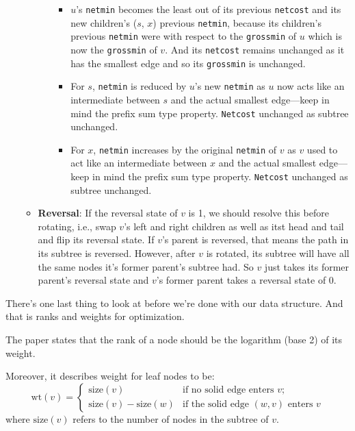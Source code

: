 \documentclass[a4paper, 11pt]{article}
\begin{document}
\begin{enumerate}
\begin{itemize}
\begin{itemize}
\begin{itemize}
            \item \(u\)’s \texttt{netmin} becomes the least out of its previous \texttt{netcost} and its new children’s (\(s\), \(x\)) previous \texttt{netmin}, because its children’s previous \texttt{netmin} were with respect to the \texttt{grossmin} of \(u\) which is now the \texttt{grossmin} of \(v\). And its \texttt{netcost} remains unchanged as it has the smallest edge and so its \texttt{grossmin} is unchanged.
            \item For \(s\), \texttt{netmin} is reduced by \(u\)’s new \texttt{netmin} as \(u\) now acts like an intermediate between \(s\) and the actual smallest edge—keep in mind the prefix sum type property. \texttt{Netcost} unchanged as subtree unchanged.
            \item For \(x\), \texttt{netmin} increases by the original \texttt{netmin} of \(v\) as \(v\) used to act like an intermediate between \(x\) and the actual smallest edge—keep in mind the prefix sum type property. \texttt{Netcost} unchanged as subtree unchanged.
        \end{itemize}
    \end{itemize}
    \item \textbf{Reversal}: If the reversal state of \(v\) is 1, we should resolve this before rotating, i.e., swap $v$'s left and right children as well as itst head and tail and flip its reversal state. If $v$'s parent is reversed, that means the path in its subtree is reversed. However, after $v$ is rotated, its subtree will have all the same nodes it's former parent's subtree had. So $v$ just takes its former parent's reversal state and $v$'s former parent takes a reversal state of 0.
\end{itemize}
\end{enumerate}
There’s one last thing to look at before we’re done with our data structure. And that is ranks and weights for optimization. 

The paper states that the rank of a node should be the logarithm (base 2) of its weight.

Moreover, it describes weight for leaf nodes to be:
\[
\text{wt}(v) = 
\begin{cases} 
\text{size}(v) & \text{if no solid edge enters } v; \\
\text{size}(v) - \text{size}(w) & \text{if the solid edge } (w, v) \text{ enters } v 
\end{cases}
\]
where \(\text{size}(v)\) refers to the number of nodes in the subtree of \(v\).
\end{document}
